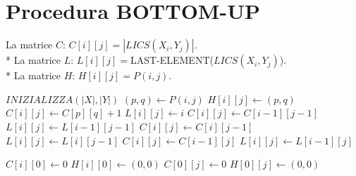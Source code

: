 \newpage

\section{Procedura BOTTOM-UP}

La matrice $C$: $C[i][j] = |LICS(X_i, Y_j)|$. \\*
La matrice $L$: $L[i][j] = $LAST-ELEMENT($LICS(X_i, Y_j)$). \\*
La matrice $H$: $H[i][j] = P(i,j)$. \\

\begin{algorithm}
    \begin{algorithmic}
            \State $INIZIALIZZA(|X|, |Y|)$
                        \State $(p, q) \gets P(i, j)$
                        \State $H[i][j] \gets (p, q)$
                            \State $C[i][j] \gets C[p][q] + 1$
                            \State $L[i][j] \gets i$
                        \Else
                            \State $C[i][j] \gets C[i-1][j-1]$
                            \State $L[i][j] \gets L[i-1][j-1]$
                        \EndIf
                    \Else
                            \State $C[i][j] \gets C[i][j-1]$
                            \State $L[i][j] \gets L[i][j-1]$
                        \Else
                            \State $C[i][j] \gets C[i-1][j]$
                            \State $L[i][j] \gets L[i-1][j]$
                        \EndIf
                    \EndIf
                \EndFor
            \EndFor
        \EndProcedure
    \end{algorithmic}
\end{algorithm}

\begin{algorithm}
    \begin{algorithmic}
                \State $C[i][0] \gets 0$
                \State $H[i][0] \gets (0,0)$
            \EndFor
                \State $C[0][j] \gets 0$
                \State $H[0][j] \gets (0,0)$
            \EndFor
        \EndProcedure
    \end{algorithmic}
\end{algorithm}

